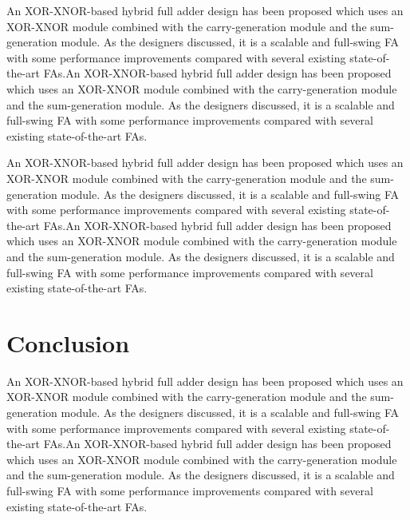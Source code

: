 \documentclass[conference]{IEEEtran}
\begin{document}
An XOR-XNOR-based hybrid full adder design has been proposed\cite{20212210429416}
which uses an XOR-XNOR module combined with the carry-generation module and the sum-generation module.
As the designers discussed, it is a scalable and full-swing FA
with some performance improvements compared with several existing state-of-the-art FAs.An XOR-XNOR-based hybrid full adder design has been proposed\cite{20212210429416}
which uses an XOR-XNOR module combined with the carry-generation module and the sum-generation module.
As the designers discussed, it is a scalable and full-swing FA
with some performance improvements compared with several existing state-of-the-art FAs.

An XOR-XNOR-based hybrid full adder design has been proposed\cite{20212210429416}
which uses an XOR-XNOR module combined with the carry-generation module and the sum-generation module.
As the designers discussed, it is a scalable and full-swing FA
with some performance improvements compared with several existing state-of-the-art FAs.An XOR-XNOR-based hybrid full adder design has been proposed\cite{20212210429416}
which uses an XOR-XNOR module combined with the carry-generation module and the sum-generation module.
As the designers discussed, it is a scalable and full-swing FA
with some performance improvements compared with several existing state-of-the-art FAs.

\section{Conclusion}
\label{sec:6}

An XOR-XNOR-based hybrid full adder design has been proposed\cite{20212210429416}
which uses an XOR-XNOR module combined with the carry-generation module and the sum-generation module.
As the designers discussed, it is a scalable and full-swing FA
with some performance improvements compared with several existing state-of-the-art FAs.An XOR-XNOR-based hybrid full adder design has been proposed\cite{20212210429416}
which uses an XOR-XNOR module combined with the carry-generation module and the sum-generation module.
As the designers discussed, it is a scalable and full-swing FA
with some performance improvements compared with several existing state-of-the-art FAs.



\end{document}
